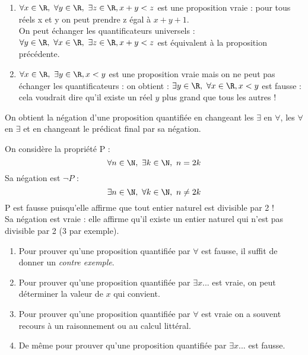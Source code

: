 \documentclass[a4paper,12pt,french]{book}
\begin{document}
\begin{exemple}[s]
	\begin{enumerate}[\textbullet]
		\item 	$\forall x\in\R,\ \forall y\in\R,\ \exists z \in\R, x+y<z$ est une proposition vraie : pour tous réels x et y on peut prendre z égal à $x+y+1$.\\
				On peut échanger les quantificateurs universels : $\forall y\in\R,\ \forall x\in\R,\ \exists z \in\R, x+y<z$ est équivalent à la proposition précédente.
		\item 	$\forall x\in\R,\ \exists y \in\R, x<y$ est une proposition vraie mais on ne peut pas échanger les quantificateurs : on obtient :
				$\exists y\in\R,\ \forall x \in\R, x<y$ est fausse : cela voudrait dire qu'il existe un réel $y$ plus grand que tous les autres !
	\end{enumerate}
\end{exemple}

\begin{propriete}
	On obtient la négation d'une proposition quantifiée en changeant les $\exists$ en $\forall$, les $\forall$ en $\exists$ et en changeant le prédicat final par sa négation.
\end{propriete}

\begin{exemple}[]
	On considère la propriété P : $$\forall n\in\N,\ \exists k\in\N,\ n=2k$$
	Sa négation est $\neg P$ :  $$\exists n\in\N,\ \forall k\in\N,\ n\neq 2k$$
	P est fausse puisqu'elle affirme que tout entier naturel est divisible par 2 !\\ Sa négation est vraie : elle affirme qu'il existe un entier naturel qui n'est pas divisible par 2 (3 par exemple).
\end{exemple}

\begin{methode}
	\begin{enumerate}[\textbullet]
		\item 	Pour prouver qu'une proposition quantifiée par $\forall$ est fausse, il suffit de donner un \textit{contre exemple}.
		\item 	Pour prouver qu'une proposition quantifiée par $\exists x...$ est vraie, on peut déterminer la valeur de $x$ qui convient.
		\item 	Pour prouver qu'une proposition quantifiée par $\forall$ est vraie on a souvent recours à un raisonnement ou au calcul littéral.
		\item 	De même pour prouver qu'une proposition quantifiée par $\exists x...$ est fausse.
	\end{enumerate}
\end{methode}
\end{document}
